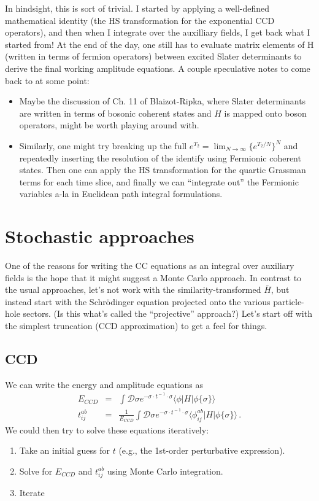 \documentclass[12pt]{article}
\begin{document}
In hindsight, this is sort of trivial. I started by applying a well-defined mathematical identity (the HS transformation for the exponential CCD operators), and then when I integrate over the auxilliary fields, I get back what I started from!  At the end of the day, one still has to evaluate matrix elements of H (written in terms of fermion operators) between excited Slater determinants to derive the final working amplitude equations. 
A couple speculative notes to come back to at some point:
\begin{itemize}
\item Maybe the discussion of Ch. 11 of Blaizot-Ripka, where Slater determinants are written in terms of bosonic coherent states and $H$ is mapped onto boson operators, might be worth playing around with.
\item Similarly, one might try breaking up the full $e^{T_2}=\lim_{N\rightarrow\infty}\{e^{T_2/N}\}^N$ and repeatedly inserting the resolution of the identify using Fermionic coherent states. Then one can apply the HS transformation for the quartic Grassman terms for each time slice, and finally we can ``integrate out'' the Fermionic variables a-la in Euclidean path integral formulations.
\end{itemize}

\section{Stochastic approaches}
One of the reasons for writing the CC equations as an integral over auxiliary fields is the hope that it might suggest a Monte Carlo approach. In contrast to the usual approaches, let's not work with the similarity-transformed $\bar{H}$, but instead start with the Schr\"odinger equation projected onto the various particle-hole sectors. (Is this what's called the ``projective'' approach?) Let's start off with the simplest truncation (CCD approximation) to get a feel for things.
\subsection{CCD}
We can write the energy and amplitude equations as
\begin{eqnarray}
E_{CCD} &=& \int \mathcal{D}\sigma e^{-\sigma\cdot t^{\!-1}\!\cdot\sigma} \langle\phi|H|\phi\{\sigma\}\rangle \\
t^{ab}_{ij} &=& \frac{1}{E_{CCD}}\int \mathcal{D}\sigma e^{-\sigma\cdot t^{\!-1}\!\cdot\sigma} \langle\phi^{ab}_{ij}|H|\phi\{\sigma\}\rangle\,.
\end{eqnarray}
We could then try to solve these equations iteratively:
\begin{enumerate}
\item Take an initial guess for $t$ (e.g., the 1st-order perturbative expression). 
\item Solve for $E_{CCD}$ and $t^{ab}_{ij}$ using Monte Carlo integration. 
\item Iterate
\end{enumerate}
\end{document}
